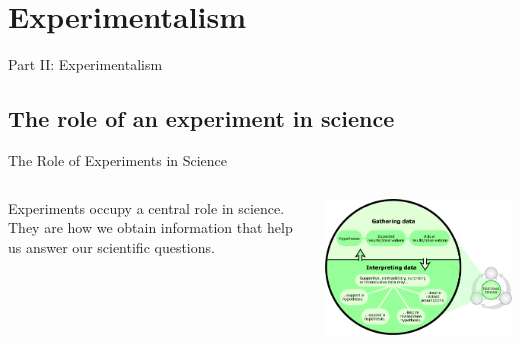 
\section{Experimentalism}
\begin{frame}
  \begin{center}
    Part II: Experimentalism
  \end{center}
\end{frame}

\subsection{The role of an experiment in science}

\begin{frame}{The Role of Experiments in Science}
  \begin{columns}
      Experiments occupy a central role in science.
      They are how we obtain information that help us answer our scientific
      questions.


      \includegraphics[width=1\textwidth]{../img/understandingscience_zoom2}
  \end{columns}
\end{frame}

